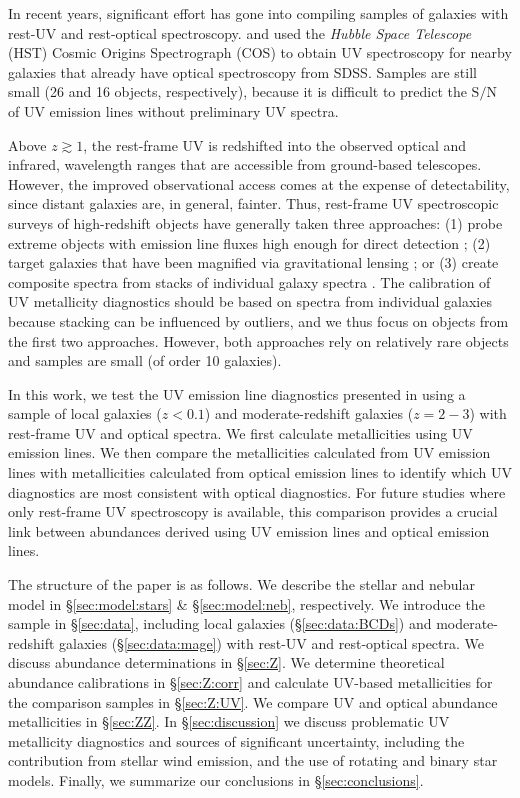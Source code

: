 \documentclass[trackchanges, preprint2]{aastex62}
\newcommand{\SN}{\ensuremath{\mathrm{S}/\mathrm{N}}\xspace}
\begin{document}
In recent years, significant effort has gone into compiling samples of galaxies with rest-UV and rest-optical spectroscopy. \citet{Berg+2016, Berg+2019} and \citet{Senchyna+2017, Senchyna+2019} used the \emph{Hubble Space Telescope} (HST) Cosmic Origins Spectrograph (COS) to obtain UV spectroscopy for nearby galaxies that already have optical spectroscopy from SDSS. Samples are still small (26 and 16 objects, respectively), because it is difficult to predict the \SN of UV emission lines without preliminary UV spectra. 


Above $z\gtrsim 1$, the rest-frame UV is redshifted into the observed optical and infrared, wavelength ranges that are accessible from ground-based telescopes. However, the improved observational access comes at the expense of detectability, since distant galaxies are, in general, fainter. Thus, rest-frame UV spectroscopic surveys of high-redshift objects have generally taken three approaches: (1) probe extreme objects with emission line fluxes high enough for direct detection \citep[e.g., ][]{Erb+2010, Stark+2014}; (2) target galaxies that have been magnified via gravitational lensing \citep[e.g.,][]{Bayliss+2014, Rigby+2018a}; or (3) create composite spectra from stacks of individual galaxy spectra \citep[e.g.,][]{Shapley+2003, Steidel+2016}. The calibration of UV metallicity diagnostics should be based on spectra from individual galaxies because stacking can be influenced by outliers, and we thus focus on objects from the first two approaches. However, both approaches rely on relatively rare objects and samples are small (of order 10 galaxies).

In this work, we test the UV emission line diagnostics presented in \citet{Byler+2018} using a sample of local galaxies ($z < 0.1$) and moderate-redshift galaxies ($z=2-3$) with rest-frame UV and optical spectra. We first calculate metallicities using UV emission lines. We then compare the metallicities calculated from UV emission lines with metallicities calculated from optical emission lines to identify which UV diagnostics are most consistent with optical diagnostics. For future studies where only rest-frame UV spectroscopy is available, this comparison provides a crucial link between abundances derived using UV emission lines and optical emission lines.

The structure of the paper is as follows. We describe the stellar and nebular model in \S\ref{sec:model:stars} \& \S\ref{sec:model:neb}, respectively. We introduce the sample in \S\ref{sec:data}, including local galaxies (\S\ref{sec:data:BCDs}) and moderate-redshift galaxies (\S\ref{sec:data:mage}) with rest-UV and rest-optical spectra. We discuss abundance determinations in \S\ref{sec:Z}. We determine theoretical abundance calibrations in \S\ref{sec:Z:corr} and calculate UV-based metallicities for the comparison samples in \S\ref{sec:Z:UV}. We compare UV and optical abundance metallicities in \S\ref{sec:ZZ}. In \S\ref{sec:discussion} we discuss problematic UV metallicity diagnostics and sources of significant uncertainty, including the contribution from stellar wind emission, and the use of rotating and binary star models. Finally, we summarize our conclusions in \S\ref{sec:conclusions}.
\end{document}
